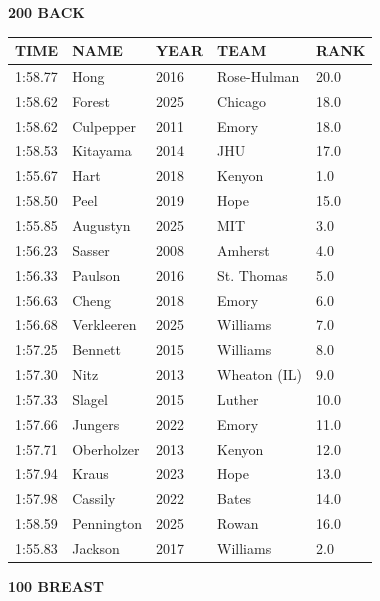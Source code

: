 \begin{table}[H]
\centering
\begin{minipage}[t]{0.48\textwidth}
\centering
\textbf{200 BACK}\\[0.1cm]
\begin{tabular}{@{}p{1.8cm}p{2.8cm}p{1.2cm}p{1.4cm}p{0.8cm}@{}}
\hline
    \textbf{TIME} & \textbf{NAME} & \textbf{YEAR} & \textbf{TEAM} & \textbf{RANK} \\
\hline
    1:58.77 & Hong & 2016 & Rose-Hulman & 20.0 \\
    1:58.62 & Forest & 2025 & Chicago & 18.0 \\
    1:58.62 & Culpepper & 2011 & Emory & 18.0 \\
    1:58.53 & Kitayama & 2014 & JHU & 17.0 \\
    1:55.67 & Hart & 2018 & Kenyon & 1.0 \\
    1:58.50 & Peel & 2019 & Hope & 15.0 \\
    1:55.85 & Augustyn & 2025 & MIT & 3.0 \\
    1:56.23 & Sasser & 2008 & Amherst & 4.0 \\
    1:56.33 & Paulson & 2016 & St. Thomas & 5.0 \\
    1:56.63 & Cheng & 2018 & Emory & 6.0 \\
    1:56.68 & Verkleeren & 2025 & Williams & 7.0 \\
    1:57.25 & Bennett & 2015 & Williams & 8.0 \\
    1:57.30 & Nitz & 2013 & Wheaton (IL) & 9.0 \\
    1:57.33 & Slagel & 2015 & Luther & 10.0 \\
    1:57.66 & Jungers & 2022 & Emory & 11.0 \\
    1:57.71 & Oberholzer & 2013 & Kenyon & 12.0 \\
    1:57.94 & Kraus & 2023 & Hope & 13.0 \\
    1:57.98 & Cassily & 2022 & Bates & 14.0 \\
    1:58.59 & Pennington & 2025 & Rowan & 16.0 \\
    1:55.83 & Jackson & 2017 & Williams & 2.0 \\
\hline
\end{tabular}
\end{minipage}\hfill
\begin{minipage}[t]{0.48\textwidth}
\centering
\textbf{100 BREAST}\\[0.1cm]
\begin{tabular}{@{}p{1.8cm}p{2.8cm}p{1.2cm}p{1.4cm}p{0.8cm}@{}}

\end{tabular}
\end{minipage}
\end{table}
